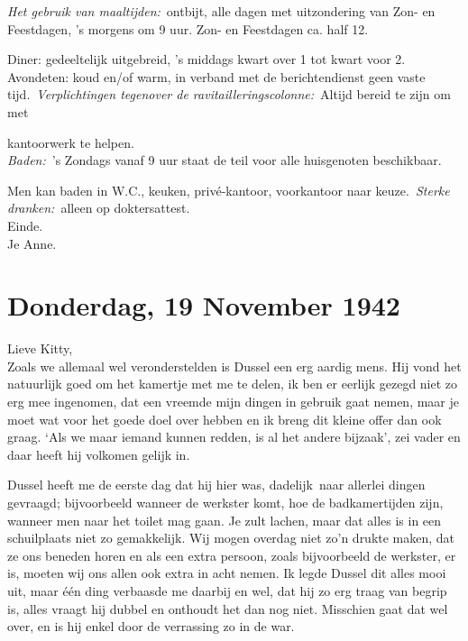 \documentclass{book}
\begin{document}
\emph{Het gebruik van maaltijden:}~ontbijt, alle dagen met uitzondering van Zon-
en Feestdagen, 's morgens om 9 uur. Zon- en Feestdagen ca. half 12.

Diner: gedeeltelijk uitgebreid, 's middags kwart over 1 tot kwart voor 2.
Avondeten: koud en/of warm, in verband met de berichtendienst geen vaste
tijd.~\emph{Verplichtingen tegenover de ravitailleringscolonne:}~Altijd bereid
te zijn om met

kantoorwerk te helpen.\\
\emph{Baden:}~'s Zondags vanaf 9 uur staat de teil voor
alle huisgenoten beschikbaar.

Men kan baden in W.C., keuken, privé-kantoor, voorkantoor naar
keuze.~\emph{Sterke dranken:}~alleen op doktersattest.\\
Einde.\\
Je Anne.

\section*{Donderdag, 19 November 1942}

Lieve Kitty,\\
Zoals we allemaal wel veronderstelden is Dussel een erg aardig
mens. Hij vond het natuurlijk goed om het kamertje met me te delen, ik ben er
eerlijk gezegd niet zo erg mee ingenomen, dat een vreemde mijn dingen in gebruik
gaat nemen, maar je moet wat voor het goede doel over hebben en ik breng dit
kleine offer dan ook graag. `Als we maar iemand kunnen redden, is al het andere
bijzaak', zei vader en daar heeft hij volkomen gelijk in.

Dussel heeft me de eerste dag dat hij hier was, dadelijk~naar allerlei dingen
gevraagd; bijvoorbeeld wanneer de werkster komt, hoe de badkamertijden zijn,
wanneer men naar het toilet mag gaan. Je zult lachen, maar dat alles is in een
schuilplaats niet zo gemakkelijk. Wij mogen overdag niet zo'n drukte maken, dat
ze ons beneden horen en als een extra persoon, zoals bijvoorbeeld de werkster,
er is, moeten wij ons allen ook extra in acht nemen. Ik legde Dussel dit alles
mooi uit, maar één ding verbaasde me daarbij en wel, dat hij zo erg traag van
begrip is, alles vraagt hij dubbel en onthoudt het dan nog niet. Misschien gaat
dat wel over, en is hij enkel door de verrassing zo in de war.
\end{document}
